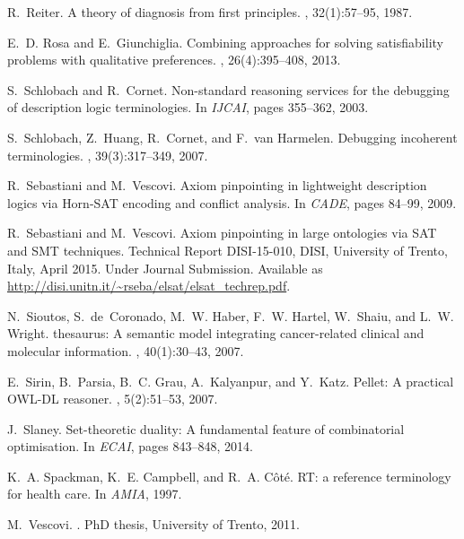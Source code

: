 \documentclass{llncs}
\begin{document}
\begin{thebibliography}{10}
R.~Reiter.
\newblock A theory of diagnosis from first principles.
, 32(1):57--95, 1987.

E.~D. Rosa and E.~Giunchiglia.
\newblock Combining approaches for solving satisfiability problems with
  qualitative preferences.
, 26(4):395--408, 2013.

S.~Schlobach and R.~Cornet.
\newblock Non-standard reasoning services for the debugging of description
  logic terminologies.
\newblock In {\em IJCAI}, pages 355--362, 2003.

S.~Schlobach, Z.~Huang, R.~Cornet, and F.~van Harmelen.
\newblock Debugging incoherent terminologies.
, 39(3):317--349, 2007.

R.~Sebastiani and M.~Vescovi.
\newblock Axiom pinpointing in lightweight description logics via {Horn-SAT}
  encoding and conflict analysis.
\newblock In {\em CADE}, pages 84--99, 2009.

R.~Sebastiani and M.~Vescovi.
\newblock Axiom pinpointing in large  ontologies via {SAT} and
  {SMT} techniques.
\newblock Technical Report DISI-15-010, DISI, University of Trento, Italy,
  April 2015.
\newblock Under Journal Submission. Available as
  \url{http://disi.unitn.it/~rseba/elsat/elsat_techrep.pdf}.

N.~Sioutos, S.~de~Coronado, M.~W. Haber, F.~W. Hartel, W.~Shaiu, and L.~W.
  Wright.
 thesaurus: {A} semantic model integrating cancer-related
  clinical and molecular information.
, 40(1):30--43, 2007.

E.~Sirin, B.~Parsia, B.~C. Grau, A.~Kalyanpur, and Y.~Katz.
\newblock Pellet: {A} practical {OWL-DL} reasoner.
, 5(2):51--53, 2007.

J.~Slaney.
\newblock Set-theoretic duality: {A} fundamental feature of combinatorial
  optimisation.
\newblock In {\em ECAI}, pages 843--848, 2014.

K.~A. Spackman, K.~E. Campbell, and R.~A. C{\^{o}}t{\'{e}}.
 {RT:} a reference terminology for health care.
\newblock In {\em AMIA}, 1997.

M.~Vescovi.
.
\newblock PhD thesis, University of Trento, 2011.

\end{thebibliography}
\end{document}
